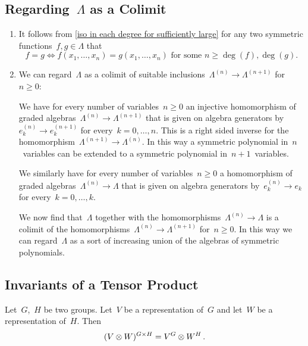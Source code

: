 \documentclass[a4paper,11pt]{scrartcl}
\begin{document}
\subsection{Regarding~$\Lambda$ as a Colimit}
\label{symmetric functions as colimit}

\begin{remark}
  \leavevmode
  \begin{enumerate}
    \item
      It follows from \cref{iso in each degree for sufficiently large} for any two symmetric functions~$f, g \in \Lambda$ that
      \[
        f = g
        \iff
        \text{$f(x_1, \dotsc, x_n) = g(x_1, \dotsc, x_n)$ for some~$n \geq \deg(f), \deg(g)$.}
      \]
    \item
      We can regard~$\Lambda$ as a colimit of suitable inclusions~$\Lambda^{(n)} \to \Lambda^{(n+1)}$ for~$n \geq 0$:

      We have for every number of variables~$n \geq 0$ an injective homomorphism of graded algebras~$\Lambda^{(n)} \to \Lambda^{(n+1)}$ that is given on algebra generators by~$e^{(n)}_k \to e^{(n+1)}_k$ for every~$k = 0, \dotsc, n$.
      This is a right sided inverse for the homomorphism~$\Lambda^{(n+1)} \to \Lambda^{(n)}$.
      In this way a symmetric polynomial in~$n$~variables can be extended to a symmetric polynomial in~$n+1$~variables.

      We similarly have for every number of variables~$n \geq 0$ a homomorphism of graded algebras~$\Lambda^{(n)} \to \Lambda$ that is given on algebra generators by~$e^{(n)}_k \to e_k$ for every~$k = 0, \dotsc, k$.

      We now find that~$\Lambda$ together with the homomorphisms~$\Lambda^{(n)} \to \Lambda$ is a colimit of the homomorphisms~$\Lambda^{(n)} \to \Lambda^{(n+1)}$ for~$n \geq 0$.
      In this way we can regard~$\Lambda$ as a sort of increasing union of the algebras of symmetric polynomials.
  \end{enumerate}
\end{remark}



\subsection{Invariants of a Tensor Product}

\begin{lemma}
  \label{invariants of tensor product}
  Let~$G$,~$H$ be two groups.
  Let~$V$ be a representation of~$G$ and let~$W$ be a representation of~$H$.
  Then
  \[
    (V \otimes W)^{G \times H}
    =
    V^G \otimes W^H \,.
  \]
\end{lemma}
\end{document}
